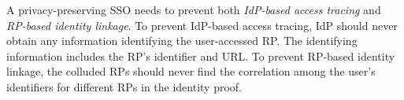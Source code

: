 A privacy-preserving SSO needs to prevent both \emph{IdP-based access tracing} and \emph{RP-based identity linkage}.
To prevent IdP-based access tracing,  IdP should never obtain any information identifying the user-accessed RP.
The identifying information includes the RP's identifier and URL.
To prevent RP-based identity linkage, the colluded RPs should never find the correlation among the user's identifiers for different RPs in the identity proof.

